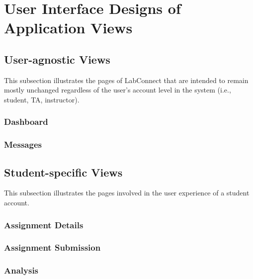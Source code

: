 \documentclass[a4paper, 12pt]{article}
\begin{document}
    
    
    
    \section{User Interface Designs of Application Views}
    
    \subsection{User-agnostic Views}
    
    This subsection illustrates the pages of LabConnect that are intended to remain mostly unchanged regardless of the user's account level in the system
    (i.e., student, TA, instructor).
    
    \subsubsection{Dashboard}
    
    
    \subsubsection{Messages}
    
    
    
    \subsection{Student-specific Views}
    
    This subsection illustrates the pages involved in the user experience of a student account.
    
    \subsubsection{Assignment Details}
    
    
    \subsubsection{Assignment Submission}
    
    
    \subsubsection{Analysis}
    
\end{document}
